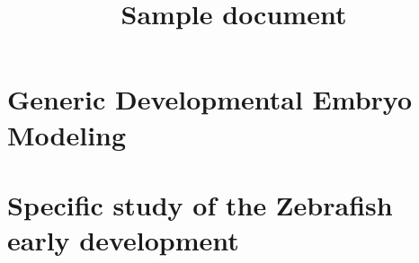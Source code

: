 \documentclass[a4paper,11pt]{article}
\title{Sample document}
\begin{document}

\setcounter{tocdepth}{5}		%
\setcounter{secnumdepth}{5}	%



\tableofcontents




\part{Generic Developmental Embryo Modeling}









\part{Specific study of the Zebrafish early development}









%


\end{document}
